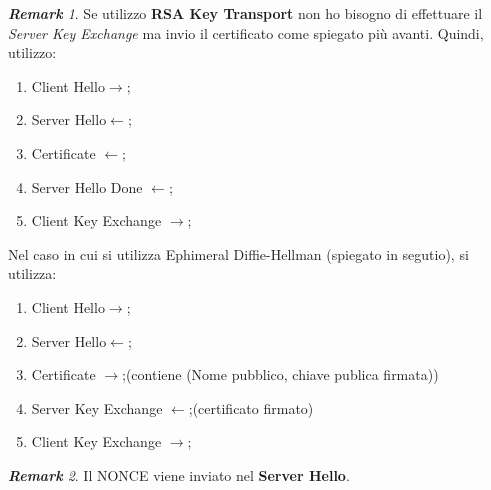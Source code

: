 \documentclass{book}
\theoremstyle{remark}
\newtheorem*{remark}{\textbf{Remark}}
\begin{document}
\begin{remark}
	Se utilizzo \textbf{RSA Key Transport} non ho bisogno di effettuare il \emph{Server Key Exchange} ma invio il certificato come spiegato più avanti\@. Quindi, utilizzo:\begin{enumerate}
		\item Client Hello\(\rightarrow\);\@
		\item Server Hello\(\leftarrow \);\@
		\item Certificate \(\leftarrow \);\@
		\item Server Hello Done \(\leftarrow\);\@
		\item Client Key Exchange	\(\rightarrow \);\@
	\end{enumerate}
	Nel caso in cui si utilizza Ephimeral Diffie-Hellman (spiegato in segutio), si utilizza:\begin{enumerate}
		\item Client Hello\(\rightarrow \);\@
		\item Server Hello\(\leftarrow \);\@
		\item Certificate \(\rightarrow\);\@ (contiene (Nome pubblico, chiave publica firmata))
		\item Server Key Exchange \(\leftarrow \);\@(certificato firmato)
		\item Client Key Exchange \(\rightarrow \);\@
	\end{enumerate}
\end{remark}
\begin{remark}
	Il NONCE viene inviato nel \textbf{Server Hello}\@.
\end{remark}
\end{document}
